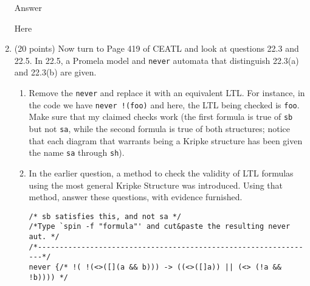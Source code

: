 \documentclass[11pt]{article}
\begin{document}
\begin{enumerate}
\begin{minipage}{\minpagw}
{{      Answer

      Here
    }%
  }%
\end{minipage}

\clearpage
  


\item (20 points) 
  Now turn to Page 419 of CEATL and look at questions 22.3 and 22.5.
  In 22.5, a Promela model and {\tt never} automata
  that distinguish 22.3(a) and 22.3(b) are given.
  \begin{enumerate}
  \item Remove the {\tt never} and replace it with an equivalent LTL.
    For instance, in the code we have {\tt never !(foo)} and here,
    the LTL being checked is {\tt foo}.
    Make sure that my claimed checks work (the first formula is true
    of {\tt sb} but not {\tt sa}, while the second formula is true
    of both structures; notice that each diagram
    that warrants being a Kripke structure has been given the name
    {\tt sa} through {\tt sh}).

  \item In the earlier question,
    a method to check the validity of LTL
    formulas using the most general Kripke Structure was introduced.
    Using that method, answer these questions, with evidence furnished.



 

\begin{verbatim}
/* sb satisfies this, and not sa */
/*Type `spin -f "formula"' and cut&paste the resulting never aut. */
/*----------------------------------------------------------------*/
never {/* !( !(<>([](a && b))) -> ((<>([]a)) || (<> (!a && !b)))) */
\end{verbatim}





\end{enumerate}
\end{enumerate}
\end{document}
